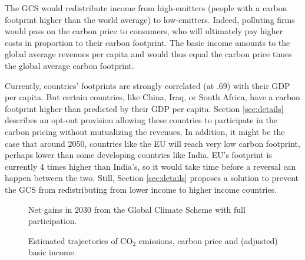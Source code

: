 \documentclass[12pt,english]{article}
\begin{document}
The GCS would redistribute income from high-emitters (people with a carbon footprint higher than the world average) to low-emitters. Indeed, polluting firms would pass on the carbon price to consumers, who will ultimately pay higher costs in proportion to their carbon footprint. The basic income amounts to the global average revenues per capita and would thus equal the carbon price times the global average carbon footprint. 

Currently, countries' footprints are strongly correlated (at .69) with their GDP per capita. But certain countries, like China, Iraq, or South Africa, have a carbon footprint higher than predicted by their GDP per capita. Section \ref{sec:details} describes an opt-out provision allowing these countries to participate in the carbon pricing without mutualizing the revenues. In addition, it might be the case that around 2050, countries like the EU will reach very low carbon footprint, perhaps lower than some developing countries like India. EU's footprint is currently 4 times higher than India's, so it would take time before a reversal can happen between the two. Still, Section \ref{sec:details} proposes a solution to prevent the GCS from redistributing from lower income to higher income countries.

\begin{figure}[h!]
    \caption{Net gains in 2030 from the Global Climate Scheme with full participation.}\label{fig:median_gain_2015}
\end{figure}

\begin{figure}[h!]
    \caption{Estimated trajectories of CO$_\text{2}$ emissions, carbon price and (adjusted) basic income.}\label{fig:trajectory}
\end{figure}
\end{document}
